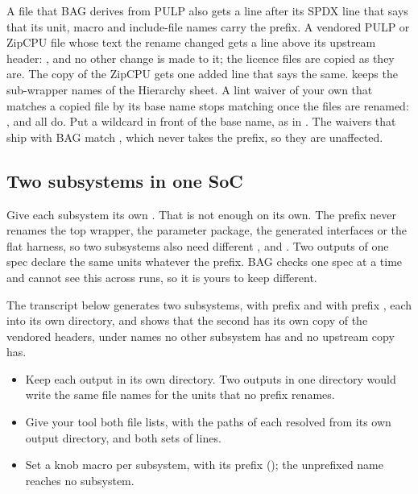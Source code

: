 A file that BAG derives from PULP also gets a line after its SPDX line that says that its
unit, macro and include-file names carry the prefix. A vendored PULP or ZipCPU file whose text
the rename changed gets a line above its upstream header: , and no other change is made to it; the
licence files are copied as they are. The copy of the
ZipCPU  gets one added line that says the same.  keeps
the sub-wrapper names of the Hierarchy sheet. A lint waiver of your
own that matches a copied file by its base name stops matching once the files are renamed:
,  and  all
do. Put a wildcard in front of the base name, as in . The waivers
that ship with BAG match , which never takes the prefix, so they are unaffected.



\subsection{Two subsystems in one SoC}
\label{sec:two-subsystems}

Give each subsystem its own . That is not enough on its own. The
prefix never renames the top wrapper, the parameter package, the generated interfaces or the
flat harness, so two subsystems also need different ,
 and . Two outputs of one spec declare
the same units whatever the prefix. BAG checks one spec at a time and cannot see this across
runs, so it is yours to keep different.

The transcript below generates two subsystems,  with prefix  and
 with prefix , each into its own directory, and shows that the second
has its own copy of the vendored headers, under names no other subsystem has and no
upstream copy has.



\begin{itemize}
\item Keep each output in its own directory. Two outputs in one directory would write the
  same file names for the units that no prefix renames.
\item Give your tool both file lists, with the paths of each resolved from its own output
  directory, and both sets of  lines.
\item Set a knob macro per subsystem, with its prefix (); the
  unprefixed name reaches no subsystem.
\end{itemize}

